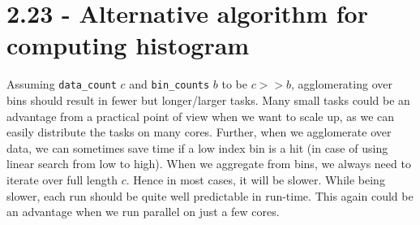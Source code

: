 \documentclass[a4paper,11pt,twoside]{article}
\begin{document}
\section{2.23 - Alternative algorithm for computing histogram}
Assuming \verb+data_count+ $c$ and \verb+bin_counts+ $b$ to be $c >> b$, agglomerating over bins should result in fewer but longer/larger tasks. Many small tasks could be an advantage from a practical point of view when we want to scale up, as we can easily distribute the tasks on many cores. Further, when we agglomerate over data, we can sometimes save time if a low index bin is a hit (in case of using linear search from low to high). When we aggregate from bins, we always need to iterate over full length $c$. Hence in most cases, it will be slower. While being slower, each run should be quite well predictable in run-time. This again could be an advantage when we run parallel on just a few cores. 


\end{document}
